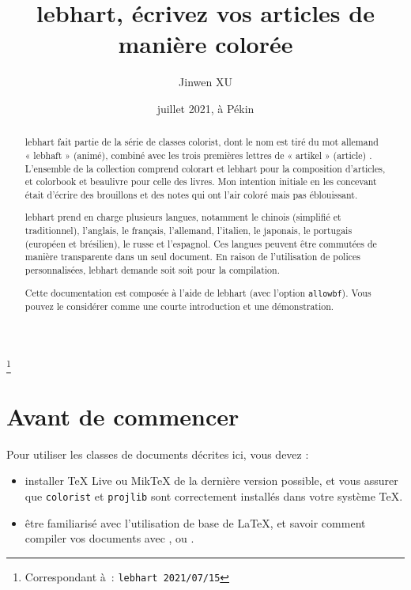 \documentclass[English,Chinese,French,allowbf,puretext]{lebhart}
\theoremstyle{basic}
\theoremstyle{emphasis}
\theoremstyle{simple}
\providecommand{\colorist}{\textsf{colorist}}
\providecommand{\colorart}{\textsf{colorart}}
\providecommand{\colorbook}{\textsf{colorbook}}
\providecommand{\lebhart}{\textsf{lebhart}}
\providecommand{\beaulivre}{\textsf{beaulivre}}
\let\LevelOneTitle\section
\begin{document}
\title{\lebhart{}, écrivez vos articles de manière colorée}
\author{Jinwen XU}
\thanks{Correspondant à : \texttt{\lebhart{} 2021/07/15}}
\date{juillet 2021, à Pékin}

\maketitle

\begin{abstract}
    \lebhart{} fait partie de la série de classes \colorist{}, dont le nom est tiré du mot allemand « lebhaft » (animé), combiné avec les trois premières lettres de « artikel » (article) . L'ensemble de la collection comprend \colorart{} et \lebhart{} pour la composition d'articles, et \colorbook{} et \beaulivre{} pour celle des livres. Mon intention initiale en les concevant était d'écrire des brouillons et des notes qui ont l'air coloré mais pas éblouissant.

    \lebhart{} prend en charge plusieurs langues, notamment le chinois (simplifié et traditionnel), l'anglais, le français, l'allemand, l'italien, le japonais, le portugais (européen et brésilien), le russe et l'espagnol. Ces langues peuvent être commutées de manière transparente dans un seul document. En raison de l'utilisation de polices personnalisées, \lebhart{} demande soit  soit  pour la compilation.

    Cette documentation est composée à l'aide de \lebhart{} (avec l'option \texttt{allowbf}). Vous pouvez le considérer comme une courte introduction et une démonstration.
\end{abstract}


\setcounter{tocdepth}{2}
\tableofcontents


\LevelOneTitle*{Avant de commencer}

Pour utiliser les classes de documents décrites ici, vous devez :
\begin{itemize}
      \item installer TeX Live ou MikTeX de la dernière version possible, et vous assurer que \texttt{colorist} et \texttt{projlib} sont correctement installés dans votre système \TeX{}.
      \item être familiarisé avec l'utilisation de base de \LaTeX{}, et savoir comment compiler vos documents avec ,  ou .
\end{itemize}
\end{document}
